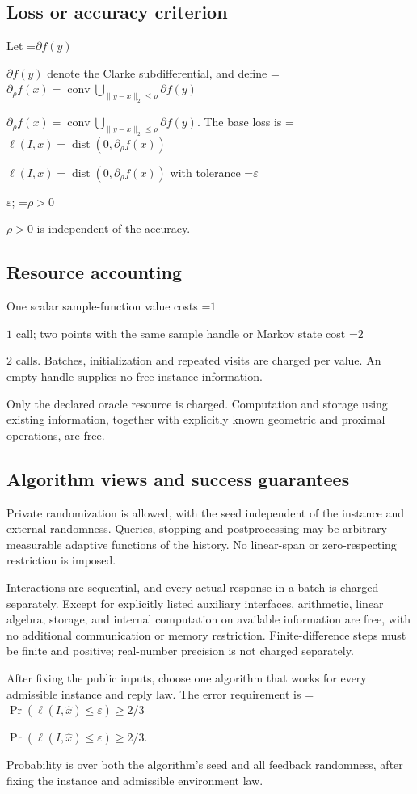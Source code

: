 \documentclass[10pt,a4paper]{article}
\newcommand{\AtlasMath}[1]{\par\begingroup\centering\setbox0=\hbox{$\displaystyle #1$}\ifdim\wd0>1.4\linewidth\typeout{ATLAS WIDE FORMULA: \the\wd0}\fi\ifdim\wd0>\linewidth\resizebox{\linewidth}{!}{\box0}\else\box0\fi\par\endgroup}
\newcommand{\AtlasInlineMath}[1]{\begingroup\setbox0=\hbox{$#1$}\ifdim\wd0>.4\linewidth\endgroup\AtlasMath{#1}\else\endgroup$#1$\fi}
\begin{document}
\subsection{Loss or accuracy criterion}
Let \AtlasInlineMath{\partial f(y)} denote the Clarke subdifferential, and define \AtlasInlineMath{\partial_\rho f(x)=\operatorname{conv}\bigcup_{\|y-x\|_2\le\rho}\partial f(y)}. The base loss is \AtlasInlineMath{\ell(I,x)=\operatorname{dist}(0,\partial_\rho f(x))} with tolerance \AtlasInlineMath{\varepsilon}; \AtlasInlineMath{\rho>0} is independent of the accuracy.

\subsection{Resource accounting}
One scalar sample-function value costs \AtlasInlineMath{1} call; two points with the same sample handle or Markov state cost \AtlasInlineMath{2} calls. Batches, initialization and repeated visits are charged per value. An empty handle supplies no free instance information.

Only the declared oracle resource is charged. Computation and storage using existing information, together with explicitly known geometric and proximal operations, are free.

\subsection{Algorithm views and success guarantees}
Private randomization is allowed, with the seed independent of the instance and external randomness. Queries, stopping and postprocessing may be arbitrary measurable adaptive functions of the history. No linear-span or zero-respecting restriction is imposed.

Interactions are sequential, and every actual response in a batch is charged separately. Except for explicitly listed auxiliary interfaces, arithmetic, linear algebra, storage, and internal computation on available information are free, with no additional communication or memory restriction. Finite-difference steps must be finite and positive; real-number precision is not charged separately.

After fixing the public inputs, choose one algorithm that works for every admissible instance and reply law. The error requirement is \AtlasInlineMath{\Pr(\ell(I,\widehat{x})\le \varepsilon)\ge2/3}.

Probability is over both the algorithm's seed and all feedback randomness, after fixing the instance and admissible environment law.
\end{document}
